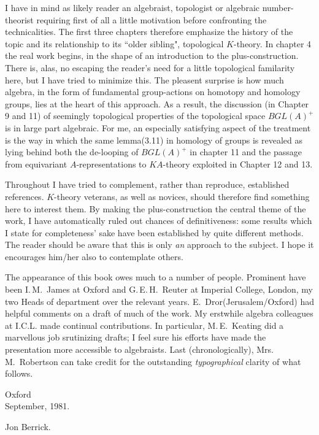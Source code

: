 I have in mind as likely reader an algebraist, topologist or algebraic number-theorist requiring first of all a little motivation before confronting the technicalities. The first three chapters therefore emphasize the history of the topic and its relationship to its ``older sibling", topological $K$-theory. In chapter 4 the real work begins, in the shape of an introduction to the plus-construction. There is, alas, no escaping the reader's need for a little topological familarity here, but I have tried to minimize this. The pleasent surprise is how much algebra, in the form of fundamental group-actions on homotopy and homology groups, lies at the heart of this approach. As a result, the discussion (in Chapter 9 and 11) of seemingly topological properties of the topological space $BGL(A)^+$ is in large part algebraic. For me, an especially satisfying aspect of the treatment is the way in which the same lemma(3.11) in homology of groups is revealed as lying behind both the de-looping of $BGL(A)^+$ in chapter 11 and the passage from equivariant $A$-representations to $KA$-theory exploited in Chapter 12 and 13. 

Throughout I have tried to complement, rather than reproduce, established references. $K$-theory veterans, as well as novices, should therefore find something here to interest them. By making the plus-construction the central theme of the work, I have automatically ruled out chances of definitiveness: some results which I state for completeness' sake have been established by quite different methods. The reader should be aware that this is only {\em an} approach to the subject. I hope it encourages him/her also to contemplate others. 

The appearance of this book owes much to a number of people. Prominent have been I.\,M.~James at Oxford and G.\,E.\,H.~Reuter at Imperial College, London, my two Heads of department over the relevant years. E.~Dror(Jerusalem/Oxford) had helpful comments on a draft of much of the work. My erstwhile algebra colleagues at I.C.L. made continual contributions. In particular, M.\,E.~Keating did a marvellous job srutinizing drafts; I feel sure his efforts have made the presentation more accessible to algebraists. Last (chronologically), Mrs. M.~Robertson can take credit for the outstanding {\em typographical} clarity of what follows.


\noindent Oxford\\
September, 1981. \\
{\begin{flushright}
  Jon Berrick.
\end{flushright}} 

